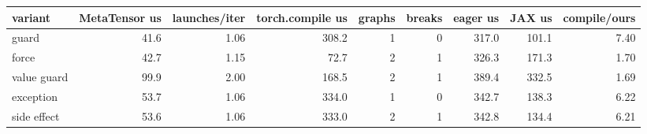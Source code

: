 \begin{tabular}{lrrrrrrrr}
\toprule
variant & MetaTensor us & launches/iter & torch.compile us & graphs & breaks & eager us & JAX us & compile/ours \\
\midrule
guard & 41.6 & 1.06 & 308.2 & 1 & 0 & 317.0 & 101.1 & 7.40 \\
force & 42.7 & 1.15 & 72.7 & 2 & 1 & 326.3 & 171.3 & 1.70 \\
value guard & 99.9 & 2.00 & 168.5 & 2 & 1 & 389.4 & 332.5 & 1.69 \\
exception & 53.7 & 1.06 & 334.0 & 1 & 0 & 342.7 & 138.3 & 6.22 \\
side effect & 53.6 & 1.06 & 333.0 & 2 & 1 & 342.8 & 134.4 & 6.21 \\
\bottomrule
\end{tabular}
